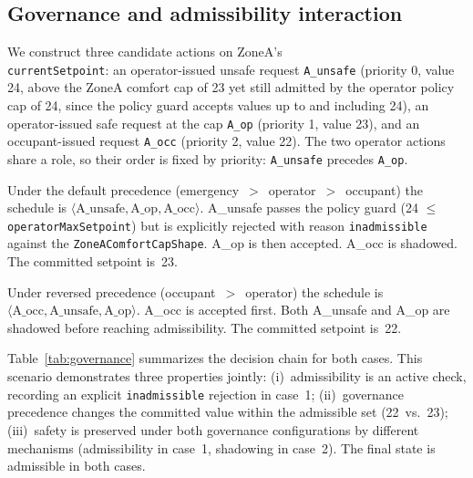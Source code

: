\documentclass{ieeeaccess}
\theoremstyle{definition}
\theoremstyle{plain}
\theoremstyle{remark}
\begin{document}
\subsection{Governance and admissibility interaction}
\label{sec:eval:governance}

We construct three candidate actions on ZoneA's \\  \texttt{currentSetpoint}: an operator-issued unsafe request \texttt{A\_unsafe} (priority 0, value 24, above the ZoneA comfort cap of 23 yet still admitted by the operator policy cap of 24, since the policy guard accepts values up to and including 24), an operator-issued safe request at the cap \texttt{A\_op} (priority 1, value 23), and an occupant-issued request \texttt{A\_occ} (priority 2, value 22). The two operator actions share a role, so their order is fixed by priority: \texttt{A\_unsafe} precedes \texttt{A\_op}.

Under the default precedence (emergency~$>$~operator~$>$~occupant) the schedule is $\langle\text{A\_unsafe}, \text{A\_op}, \text{A\_occ}\rangle$. A\_unsafe passes the policy guard (24 $\leq$ \texttt{operatorMaxSetpoint}) but is explicitly rejected with reason \texttt{inadmissible} against the \texttt{ZoneAComfortCapShape}. A\_op is then accepted. A\_occ is shadowed. The committed setpoint is~23.

Under reversed precedence (occupant~$>$~operator) the schedule is $\langle\text{A\_occ}, \text{A\_unsafe}, \text{A\_op}\rangle$. A\_occ is accepted first. Both A\_unsafe and A\_op are shadowed before reaching admissibility. The committed setpoint is~22.

Table~\ref{tab:governance} summarizes the decision chain for both cases. This scenario demonstrates three properties jointly: (i)~admissibility is an active check, recording an explicit \texttt{inadmissible} rejection in case~1; (ii)~governance precedence changes the committed value within the admissible set (22~vs.~23); (iii)~safety is preserved under both governance configurations by different mechanisms (admissibility in case~1, shadowing in case~2). The final state is admissible in both cases.
\end{document}
